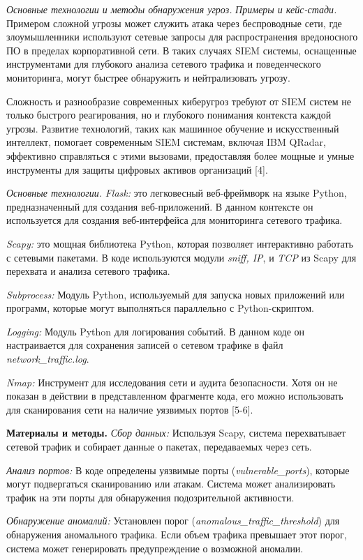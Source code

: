 \emph{Основные технологии и методы обнаружения угроз.} \emph{Примеры и
кейс-стади.} Примером сложной угрозы может служить атака через
беспроводные сети, где злоумышленники используют сетевые запросы для
распространения вредоносного ПО в пределах корпоративной сети. В таких
случаях SIEM системы, оснащенные инструментами для глубокого анализа
сетевого трафика и поведенческого мониторинга, могут быстрее обнаружить
и нейтрализовать угрозу.

Сложность и разнообразие современных киберугроз требуют от SIEM систем
не только быстрого реагирования, но и глубокого понимания контекста
каждой угрозы. Развитие технологий, таких как машинное обучение и
искусственный интеллект, помогает современным SIEM системам, включая IBM
QRadar, эффективно справляться с этими вызовами, предоставляя более
мощные и умные инструменты для защиты цифровых активов организаций
{[}4{]}.

\emph{Основные технологии.} \emph{Flask:} это легковесный веб-фреймворк
на языке Python, предназначенный для создания веб-приложений. В данном
контексте он используется для создания веб-интерфейса для мониторинга
сетевого трафика.

\emph{Scapy:} это мощная библиотека Python, которая позволяет
интерактивно работать с сетевыми пакетами. В коде используются модули
\emph{sniff, IP}, и \emph{TCP} из Scapy для перехвата и анализа сетевого
трафика.

\emph{Subprocess:} Модуль Python, используемый для запуска новых
приложений или программ, которые могут выполняться параллельно с
Python-скриптом.

\emph{Logging:} Модуль Python для логирования событий. В данном коде он
настраивается для сохранения записей о сетевом трафике в файл
\emph{network\_traffic.log}.

\emph{Nmap:} Инструмент для исследования сети и аудита безопасности.
Хотя он не показан в действии в представленном фрагменте кода, его можно
использовать для сканирования сети на наличие уязвимых портов {[}5-6{]}.

\textbf{Материалы и методы.} \emph{Сбор данных:} Используя Scapy,
система перехватывает сетевой трафик и собирает данные о пакетах,
передаваемых через сеть.

\emph{Анализ портов:} В коде определены уязвимые порты
(\emph{vulnerable\_ports}), которые могут подвергаться сканированию или
атакам. Система может анализировать трафик на эти порты для обнаружения
подозрительной активности.

\emph{Обнаружение аномалий:} Установлен порог
(\emph{anomalous\_traffic\_threshold}) для обнаружения аномального
трафика. Если объем трафика превышает этот порог, система может
генерировать предупреждение о возможной аномалии.


